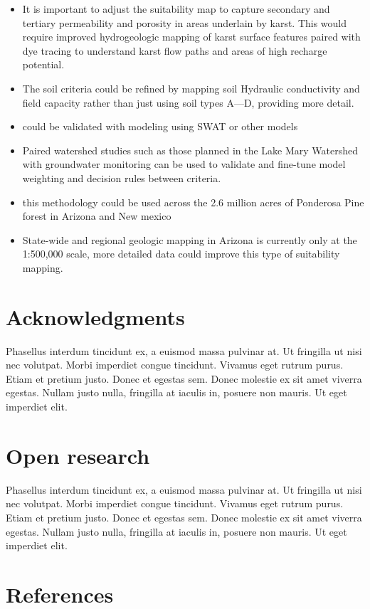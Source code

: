 \documentclass[
  number,
  preprint,
  3p,
  onecolumn]{elsarticle}
\begin{document}
\begin{itemize}
\item
  It is important to adjust the suitability map to capture secondary and
  tertiary permeability and porosity in areas underlain by karst. This
  would require improved hydrogeologic mapping of karst surface features
  paired with dye tracing to understand karst flow paths and areas of
  high recharge potential.
\item
  The soil criteria could be refined by mapping soil Hydraulic
  conductivity and field capacity rather than just using soil types
  A---D, providing more detail.
\item
  could be validated with modeling using SWAT or other models
\item
  Paired watershed studies such as those planned in the Lake Mary
  Watershed with groundwater monitoring can be used to validate and
  fine-tune model weighting and decision rules between criteria.
\item
  this methodology could be used across the 2.6 million acres of
  Ponderosa Pine forest in Arizona and New mexico
\item
  State-wide and regional geologic mapping in Arizona is currently only
  at the 1:500,000 scale, more detailed data could improve this type of
  suitability mapping.
\end{itemize}

\section{Acknowledgments}\label{acknowledgments}

Phasellus interdum tincidunt ex, a euismod massa pulvinar at. Ut
fringilla ut nisi nec volutpat. Morbi imperdiet congue tincidunt.
Vivamus eget rutrum purus. Etiam et pretium justo. Donec et egestas sem.
Donec molestie ex sit amet viverra egestas. Nullam justo nulla,
fringilla at iaculis in, posuere non mauris. Ut eget imperdiet elit.

\section{Open research}\label{open-research}

Phasellus interdum tincidunt ex, a euismod massa pulvinar at. Ut
fringilla ut nisi nec volutpat. Morbi imperdiet congue tincidunt.
Vivamus eget rutrum purus. Etiam et pretium justo. Donec et egestas sem.
Donec molestie ex sit amet viverra egestas. Nullam justo nulla,
fringilla at iaculis in, posuere non mauris. Ut eget imperdiet elit.

\section*{References}\label{references}

\renewcommand{\bibsection}{}

\end{document}
